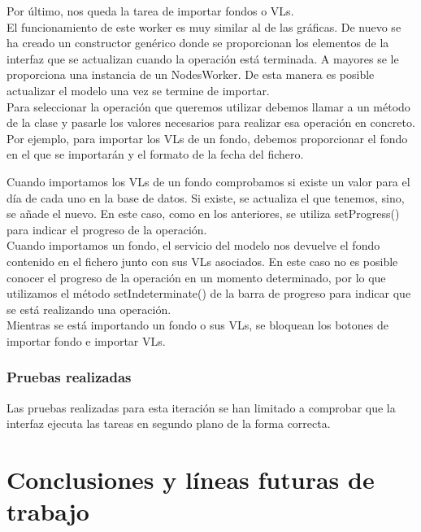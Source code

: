 \documentclass[12pt, a4paper]{book}
\begin{document}
Por último, nos queda la tarea de importar fondos o \gls{VL}s.\\

El funcionamiento de este worker es muy similar al de las gráficas. De nuevo se ha creado un constructor genérico donde se proporcionan los elementos de la interfaz que se actualizan cuando la operación está terminada. A mayores se le proporciona una instancia de un NodesWorker. De esta manera es posible actualizar el modelo una vez se termine de importar.\\

Para seleccionar la operación que queremos utilizar debemos llamar a un método de la clase y pasarle los valores necesarios para realizar esa operación en concreto. Por ejemplo, para importar los \gls{VL}s de un fondo, debemos proporcionar el fondo en el que se importarán y el formato de la fecha del fichero.\\

\newpage

Cuando importamos los \gls{VL}s de un fondo comprobamos si existe un valor para el día de cada uno en la base de datos. Si existe, se actualiza el que tenemos, sino, se añade el nuevo. En este caso, como en los anteriores, se utiliza setProgress() para indicar el progreso de la operación.\\

Cuando importamos un fondo, el servicio del modelo nos devuelve el fondo contenido en el fichero junto con sus \gls{VL}s asociados. En este caso no es posible conocer el progreso de la operación en un momento determinado, por lo que utilizamos el método setIndeterminate() de la barra de progreso para indicar que se está realizando una operación.\\

Mientras se está importando un fondo o sus \gls{VL}s, se bloquean los botones de importar fondo e importar \gls{VL}s.

\subsection{Pruebas realizadas}

Las pruebas realizadas para esta iteración se han limitado a comprobar que la interfaz ejecuta las tareas en segundo plano de la forma correcta.

\newpage

\chapter{Conclusiones y líneas futuras de trabajo}
\end{document}
